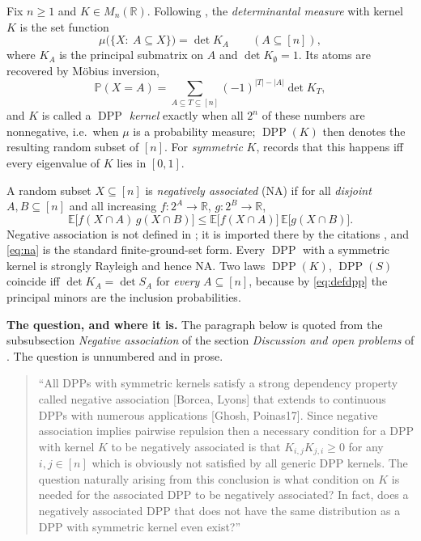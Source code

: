 \documentclass[11pt]{amsart}
\theoremstyle{remark}
\DeclareMathOperator{\DPP}{DPP}
\newcommand{\bbR}{\mathbb R}
\begin{document}
Fix $n\ge1$ and $K\in M_{n}(\bbR)$. Following \cite[\S2]{Poinas}, the \emph{determinantal
measure} with kernel $K$ is the set function
\begin{equation}\label{eq:defdpp}
 \mu\bigl(\{X:\ A\subseteq X\}\bigr)=\det K_{A}\qquad(A\subseteq[n]),
\end{equation}
where $K_{A}$ is the principal submatrix on $A$ and $\det K_{\emptyset}=1$. Its atoms are
recovered by M\"obius inversion,
\begin{equation}\label{eq:mobius}
 \mathbb P(X=A)=\sum_{A\subseteq T\subseteq[n]}(-1)^{|T|-|A|}\det K_{T},
\end{equation}
and $K$ is called a \emph{$\DPP$ kernel} exactly when all $2^{n}$ of these numbers are
nonnegative, i.e.\ when $\mu$ is a probability measure; $\DPP(K)$ then denotes the resulting
random subset of $[n]$. For \emph{symmetric} $K$, \cite[\S2]{Poinas} records that this
happens iff every eigenvalue of $K$ lies in $[0,1]$.

A random subset $X\subseteq[n]$ is \emph{negatively associated} (NA) if for all
\emph{disjoint} $A,B\subseteq[n]$ and all increasing $f\colon2^{A}\to\bbR$,
$g\colon2^{B}\to\bbR$,
\begin{equation}\label{eq:na}
 \mathbb E\bigl[f(X\cap A)\,g(X\cap B)\bigr]\le
 \mathbb E\bigl[f(X\cap A)\bigr]\,\mathbb E\bigl[g(X\cap B)\bigr].
\end{equation}
Negative association is not defined in \cite{Poinas}; it is imported there by the citations
\cite{BBL,Lyons}, and \eqref{eq:na} is the standard finite-ground-set form. Every $\DPP$
with a symmetric kernel is strongly Rayleigh \cite{BBL} and hence NA. Two laws
$\DPP(K)$, $\DPP(S)$ coincide iff $\det K_{A}=\det S_{A}$ for \emph{every} $A\subseteq[n]$,
because by \eqref{eq:defdpp} the principal minors are the inclusion probabilities.

\medskip
\noindent\textbf{The question, and where it is.}
The paragraph below is quoted from the subsubsection \emph{Negative association} of the
section \emph{Discussion and open problems} of \cite{Poinas}. The question is unnumbered and
in prose.

\begin{quote}
``All DPPs with symmetric kernels satisfy a strong dependency property called negative
association [Borcea, Lyons] that extends to continuous DPPs with numerous applications
[Ghosh, Poinas17]. Since negative association implies pairwise repulsion then a necessary
condition for a DPP with kernel $K$ to be negatively associated is that
$K_{i,j}K_{j,i}\ge 0$ for any $i,j\in[n]$ which is obviously not satisfied by all generic
DPP kernels. The question naturally arising from this conclusion is what condition on $K$ is
needed for the associated DPP to be negatively associated? In fact, does a negatively
associated DPP that does not have the same distribution as a DPP with symmetric kernel even
exist?''
\end{quote}
\end{document}
